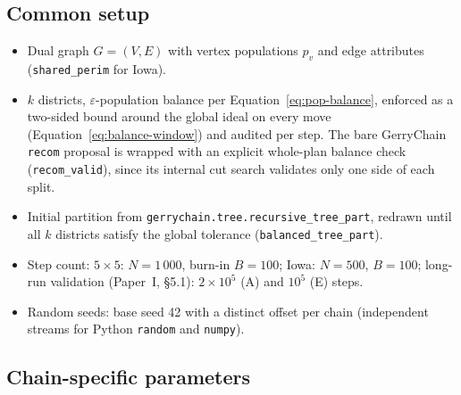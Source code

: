 \documentclass[11pt]{article}
\begin{document}
\subsection{Common setup}\label{app:common}

\begin{itemize}
  \item Dual graph $G = (V, E)$ with vertex populations $p_v$ and
    edge attributes (\texttt{shared\_perim} for Iowa).
  \item $k$ districts, $\varepsilon$-population balance per
    Equation~\eqref{eq:pop-balance}, enforced as a two-sided bound around the
    global ideal on every move (Equation~\eqref{eq:balance-window})
    and audited per step. The bare GerryChain \texttt{recom} proposal
    is wrapped with an explicit whole-plan balance check
    (\texttt{recom\_valid}), since its internal cut search validates
    only one side of each split.
  \item Initial partition from
    \texttt{gerrychain.tree.recursive\_tree\_part}, redrawn until all
    $k$ districts satisfy the global tolerance
    (\texttt{balanced\_tree\_part}).
  \item Step count: $5 \times 5$: $N = 1\,000$, burn-in $B = 100$;
    Iowa: $N = 500$, $B = 100$; long-run validation
    (Paper~I, \S5.1): $2 \times 10^5$ (A) and
    $10^5$ (E) steps.
  \item Random seeds: base seed 42 with a distinct offset per chain
    (independent streams for Python \texttt{random} and
    \texttt{numpy}).
\end{itemize}

\subsection{Chain-specific parameters}\label{app:chains}
\end{document}
